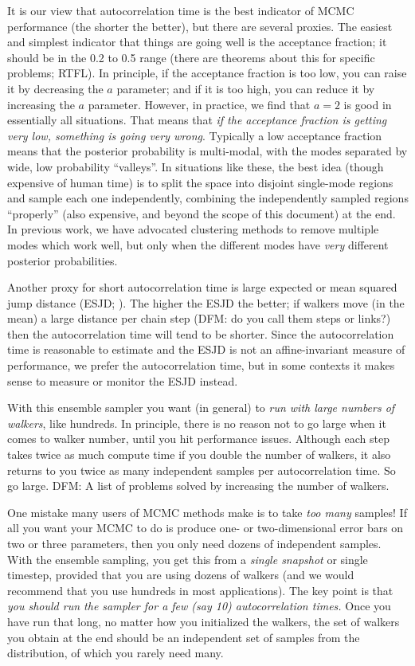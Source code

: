 \documentclass[12pt,preprint]{aastex}
\begin{document}
It is our view that autocorrelation time is the best indicator of MCMC
performance (the shorter the better), but there are several proxies.
The easiest and simplest indicator that things are going well is the
acceptance fraction; it should be in the 0.2 to 0.5 range (there are
theorems about this for specific problems; RTFL).  In principle, if
the acceptance fraction is too low, you can raise it by decreasing the
$a$ parameter; and if it is too high, you can reduce it by increasing
the $a$ parameter.  However, in practice, we find that $a=2$ is good
in essentially all situations.  That means that \emph{if the
  acceptance fraction is getting very low, something is going very
  wrong}.  Typically a low acceptance fraction means that the
posterior probability is multi-modal, with the modes separated by
wide, low probability ``valleys''.  In situations like these, the best
idea (though expensive of human time) is to split the space into
disjoint single-mode regions and sample each one independently,
combining the independently sampled regions ``properly'' (also
expensive, and beyond the scope of this document) at the end.  In
previous work, we have advocated clustering methods to remove multiple
modes \citep{Hou:2011} which work well, but only when the different
modes have \emph{very} different posterior probabilities.

Another proxy for short autocorrelation time is large expected or mean
squared jump distance (ESJD; \citealt{Pasarica:2010}).  The higher the
ESJD the better; if walkers move (in the mean) a large distance per
chain step (DFM: do you call them steps or links?) then the
autocorrelation time will tend to be shorter.  Since the
autocorrelation time is reasonable to estimate and the ESJD is not an
affine-invariant measure of performance, we prefer the autocorrelation
time, but in some contexts it makes sense to measure or monitor the
ESJD instead.

With this ensemble sampler you want (in general) to \emph{run with
  large numbers of walkers}, like hundreds.  In principle, there is no
reason not to go large when it comes to walker number, until you hit
performance issues.  Although each step takes twice as much compute
time if you double the number of walkers, it also returns to you twice
as many independent samples per autocorrelation time.  So go large.
DFM: A list of problems solved by increasing the number of walkers.

One mistake many users of MCMC methods make is to take \emph{too many}
samples!  If all you want your MCMC to do is produce one- or
two-dimensional error bars on two or three parameters, then you only
need dozens of independent samples.  With the ensemble sampling, you
get this from a \emph{single snapshot} or single timestep, provided
that you are using dozens of walkers (and we would recommend that you
use hundreds in most applications).  The key point is that \emph{you
  should run the sampler for a few (say 10) autocorrelation times.}
Once you have run that long, no matter how you initialized the
walkers, the set of walkers you obtain at the end should be an
independent set of samples from the distribution, of which you rarely
need many.
\end{document}

